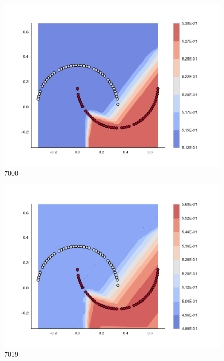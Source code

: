 \begin{subfigure}[b]{0.09\textwidth}
    \includegraphics[clip, trim=2.35cm 1.75cm 4.5cm 0cm,width=\textwidth]{img/convergence/7000.pdf}
    \caption{7000}
    \label{fig:convergence_7000}
\end{subfigure}
%
\begin{subfigure}[b]{0.09\textwidth}
    \includegraphics[clip, trim=2.35cm 1.75cm 4.5cm 0cm,width=\textwidth]{img/convergence/7019.pdf}
    \caption{7019}
    \label{fig:convergence_7019}
\end{subfigure}
%
